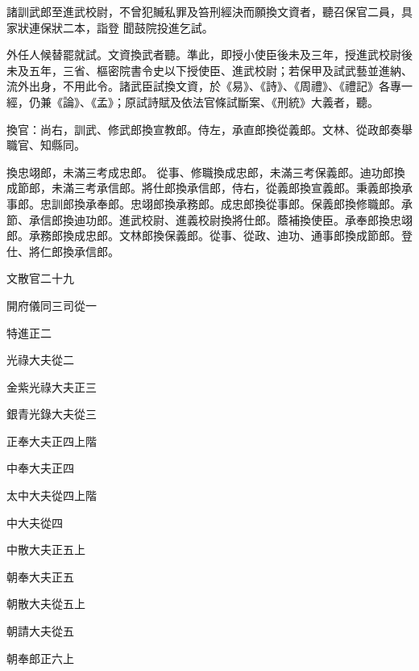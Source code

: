 \begin{pinyinscope}
 諸訓武郎至進武校尉，不曾犯贓私罪及笞刑經決而願換文資者，聽召保官二員，具家狀連保狀二本，詣登
 聞鼓院投進乞試。



 外任人候替罷就試。文資換武者聽。準此，即授小使臣後未及三年，授進武校尉後未及五年，三省、樞密院書令史以下授使臣、進武校尉；若保甲及試武藝並進納、流外出身，不用此令。諸武臣試換文資，於《易》、《詩》、《周禮》、《禮記》各專一經，仍兼《論》、《孟》；原試詩賦及依法官條試斷案、《刑統》大義者，聽。



 換官：尚右，訓武、修武郎換宣教郎。侍左，承直郎換從義郎。文林、從政郎奏舉職官、知縣同。



 換忠翊郎，未滿三考成忠郎。
 從事、修職換成忠郎，未滿三考保義郎。迪功郎換成節郎，未滿三考承信郎。將仕郎換承信郎，侍右，從義郎換宣義郎。秉義郎換承事郎。忠訓郎換承奉郎。忠翊郎換承務郎。成忠郎換從事郎。保義郎換修職郎。承節、承信郎換迪功郎。進武校尉、進義校尉換將仕郎。蔭補換使臣。承奉郎換忠翊郎。承務郎換成忠郎。文林郎換保義郎。從事、從政、迪功、通事郎換成節郎。登仕、將仁郎換承信郎。



 文散官二十九



 開府儀同三司從一



 特進正二



 光祿大夫從二



 金紫光祿大夫正三



 銀青光錄大夫從三



 正奉大夫正四上階



 中奉大夫正四



 太中大夫從四上階



 中大夫從四



 中散大夫正五上



 朝奉大夫正五



 朝散大夫從五上



 朝請大夫從五



 朝奉郎正六上




\end{pinyinscope}
